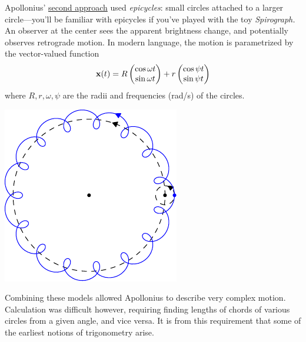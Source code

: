 \begin{minipage}[t]{0.68\linewidth}\vspace{0pt}
	Apollonius' \href{http://brunelleschi.imss.fi.it/galileopalazzostrozzi/multimedia/ApolloniusEpicycles.html}{second approach} used \emph{epicycles}: small circles attached to a larger circle---you'll be familiar with epicycles if you've played with the toy \emph{Spirograph.} An observer at the center sees the apparent brightness change, and potentially observes retrograde motion. In modern language, the motion is parametrized by the vector-valued function
	\[
		{\mathbf{x}}(t)=R\begin{pmatrix}\cos \omega t\\\sin \omega t\end{pmatrix}+r\begin{pmatrix}\cos \psi t\\\sin \psi t\end{pmatrix}
	\]
	where $R,r,\omega,\psi$ are the radii and frequencies (rad/s) of the circles.
\end{minipage}
\hfill
\begin{minipage}[t]{0.31\linewidth}\vspace{0pt}
  \flushright\includegraphics{trig-epicycle1}
\end{minipage}
\medbreak
  
Combining these models allowed Apollonius to describe very complex motion. Calculation was difficult however, requiring finding lengths of chords of various circles from a given angle, and vice versa. It is from this requirement that some of the earliest notions of trigonometry arise.\medbreak
 
